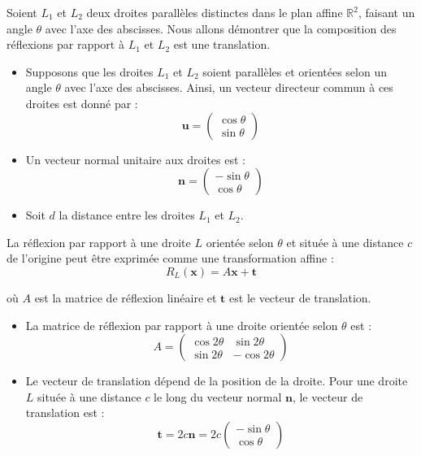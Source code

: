 Soient $L_1$ et $L_2$ deux droites parall{\`e}les distinctes dans le plan
affine $\mathbb{R}^2$, faisant un angle $\theta$ avec l'axe des abscisses.
Nous allons d{\'e}montrer que la composition des r{\'e}flexions par rapport
{\`a} $L_1$ et $L_2$ est une translation.
\begin{itemize}
  \item Supposons que les droites $L_1$ et $L_2$ soient parall{\`e}les et
  orient{\'e}es selon un angle $\theta$ avec l'axe des abscisses. Ainsi, un
  vecteur directeur commun {\`a} ces droites est donn{\'e} par :
  \[ \mathbf{u} = \left(\begin{array}{c}
       \cos \theta\\
       \sin \theta
     \end{array}\right) \]
  \item Un vecteur normal unitaire aux droites est :
  \[ \mathbf{n} = \left(\begin{array}{c}
       - \sin \theta\\
       \cos \theta
     \end{array}\right) \]
  \item Soit $d$ la distance entre les droites $L_1$ et $L_2$.
\end{itemize}


La r{\'e}flexion par rapport {\`a} une droite $L$ orient{\'e}e selon $\theta$
et situ{\'e}e {\`a} une distance $c$ de l'origine peut {\^e}tre exprim{\'e}e
comme une transformation affine :
\[ R_L (\mathbf{x}) = A \mathbf{x} + \mathbf{t} \]


o{\`u} $A$ est la matrice de r{\'e}flexion lin{\'e}aire et $\mathbf{t}$ est le
vecteur de translation.
\begin{itemize}
  \item La matrice de r{\'e}flexion par rapport {\`a} une droite orient{\'e}e
  selon $\theta$ est :
  \[ A = \left(\begin{array}{cc}
       \cos 2 \theta & \sin 2 \theta\\
       \sin 2 \theta & - \cos 2 \theta
     \end{array}\right) \]
  \item Le vecteur de translation d{\'e}pend de la position de la droite. Pour
  une droite $L$ situ{\'e}e {\`a} une distance $c$ le long du vecteur normal
  $\mathbf{n}$, le vecteur de translation est :
  \[ \mathbf{t} = 2 c \mathbf{n} = 2 c \left(\begin{array}{c}
       - \sin \theta\\
       \cos \theta
     \end{array}\right) \]
\end{itemize}


